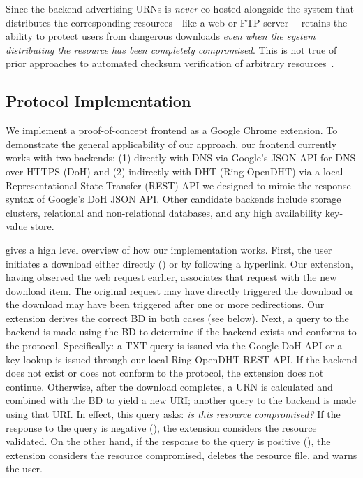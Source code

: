 Since the backend advertising URNs is \emph{never} co-hosted alongside the
system that distributes the corresponding resources---like a web or FTP
server---\SYSTEM{} retains the ability to protect users from dangerous downloads
\emph{even when the system distributing the resource has been completely
compromised}. This is not true of prior approaches to automated checksum
verification of arbitrary resources~\cite{Cherubini}.

\subsection{Protocol Implementation}


We implement a proof-of-concept \SYSTEM{} frontend as a Google Chrome extension.
To demonstrate the general applicability of our approach, our frontend currently
works with two backends: (1) directly with DNS via Google's JSON API for DNS
over HTTPS (DoH) and (2) indirectly with DHT (Ring OpenDHT) via a local
Representational State Transfer (REST) API we designed to mimic the response
syntax of Google's DoH JSON API. Other candidate backends include storage
clusters, relational and non-relational databases, and any high availability
key-value store.

 gives a high level overview of how our implementation
works. First, the user initiates a download either directly () or by following a hyperlink. Our extension, having observed the web
request earlier, associates that request with the new download item. The
original request may have directly triggered the download or the download may
have been triggered after one or more redirections. Our extension derives the
correct BD in both cases (see below). Next, a query to the backend is made using
the BD to determine if the backend exists and conforms to the \SYSTEM{}
protocol. Specifically: a TXT query is issued via the Google DoH API or a key
lookup is issued through our local Ring OpenDHT REST API. If the backend does
not exist or does not conform to the protocol, the extension does not continue.
Otherwise, after the download completes, a URN is calculated and combined with
the BD to yield a new URI; another query to the backend is made using that URI.
In effect, this query asks: \emph{is this resource compromised?} If the response
to the query is negative (), the
extension considers the resource validated. On the other hand, if the response
to the query is positive (), the extension considers the
resource compromised, deletes the resource file, and warns the user.

